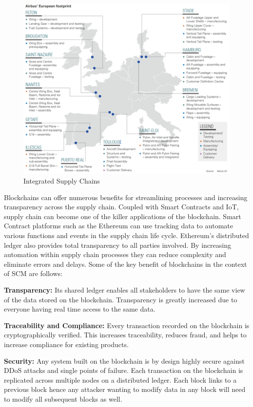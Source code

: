 \begin{figure}[h]
	\centering
    \includegraphics[width=120mm,scale=1]{figs/Airbus-1}
	\caption{Integrated Supply Chains \cite{Airbus:ADS}}
	\label{fig:Airbus} 
\end{figure} 

Blockchains can offer numerous benefits for streamlining processes and increasing transparency across the supply chain. Coupled with Smart Contracts and IoT, supply chain can become one of the killer applications of the blockchain. Smart Contract platforms such as the Ethereum can use tracking data to automate various functions and events in the supply chain life cycle. Ethereum’s distributed ledger also provides total transparency to all parties involved. By increasing automation within supply chain processes they can reduce complexity and eliminate errors and delays. Some of the key benefit of blockchains in the context of SCM are follows:

\textbf{Transparency:}
Its shared ledger enables all stakeholders to have the same view of the data stored on the blockchain. Transparency is greatly increased due to everyone having real time access to the same data.

\textbf{Traceability and Compliance:}
Every transaction recorded on the blockchain is cryptographically verified. This increases traceability, reduces fraud, and helps to increase compliance for existing products. 

\textbf{Security:}
Any system built on the blockchain is by design highly secure against DDoS attacks and single points of failure. Each transaction on the blockchain is replicated across multiple nodes on a distributed ledger. Each block links to a previous block hence any attacker wanting to modify data in any block will need to modify all subsequent blocks as well.

